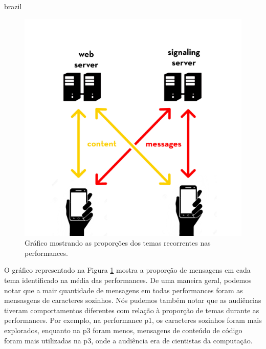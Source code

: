 \begin{otherlanguage*}{brazil}
\begin{figure}[ht!]
\centering
\includegraphics[width=1\linewidth]{pictures/server.jpg}
\caption{Gráfico mostrando as proporções dos temas recorrentes nas performances.}
\label{donut}
\end{figure}

O gráfico representado na Figura \ref{donut} mostra a proporção de mensagens em cada tema identificado na média das performances. De uma maneira geral, podemos notar que a mair quantidade de mensagens em todas performances foram as mensasgens de caracteres sozinhos. Nós pudemos também notar que as audiências tiveram comportamentos diferentes com relação à proporção de temas durante as performances. Por exemplo, na performance p1, os caracteres sozinhos foram mais explorados, enquanto na p3 foram menos, mensagens de conteúdo de código foram mais utilizadas na p3, onde a audiência era de cientistas da computação.



\end{otherlanguage*}

